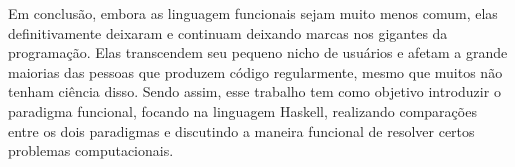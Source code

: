 Em conclusão, embora as linguagem funcionais sejam muito menos comum, elas definitivamente deixaram e continuam deixando marcas nos gigantes da programação.
Elas transcendem seu pequeno nicho de usuários e afetam a grande maiorias das pessoas que produzem código regularmente, mesmo que muitos não tenham ciência disso.
Sendo assim, esse trabalho tem como objetivo introduzir o paradigma funcional, focando na linguagem Haskell, realizando comparações entre os dois paradigmas e discutindo a maneira funcional de resolver certos problemas computacionais.

